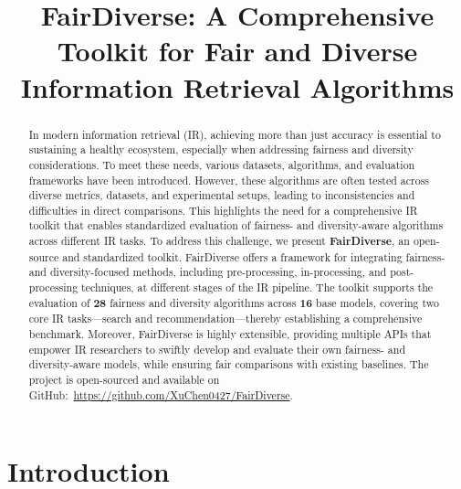 \documentclass[sigconf]{acmart}
\title[FairDiverse: A Comprehensive Toolkit for Fair and Diverse Information Retrieval Algorithms]{FairDiverse: A Comprehensive Toolkit for Fair and Diverse \\Information Retrieval Algorithms}
\begin{document}
\begin{abstract}
In modern information retrieval (IR), achieving more than just accuracy is essential to sustaining a healthy ecosystem, especially when addressing fairness and diversity considerations. To meet these needs, various datasets, algorithms, and evaluation frameworks have been introduced. However, these algorithms are often tested across diverse metrics, datasets, and experimental setups, leading to inconsistencies and difficulties in direct comparisons.
This highlights the need for a comprehensive IR toolkit that enables standardized evaluation of fairness- and diversity-aware algorithms across different IR tasks. To address this challenge, we present \textbf{FairDiverse}, an open-source and standardized toolkit.
FairDiverse offers a framework for integrating fairness- and diversity-focused methods, including pre-processing, in-processing, and post-processing techniques, at different stages of the IR pipeline. The toolkit supports the evaluation of \textbf{28} fairness and diversity algorithms across \textbf{16} base models, covering two core IR tasks—search and recommendation—thereby establishing a comprehensive benchmark.
Moreover, FairDiverse is highly extensible, providing multiple APIs that empower IR researchers to swiftly develop and evaluate their own fairness- and diversity-aware models, while ensuring fair comparisons with existing baselines. The project is open-sourced and available on GitHub:~\url{https://github.com/XuChen0427/FairDiverse}.


\end{abstract}

\maketitle

\section{Introduction}

\end{document}

